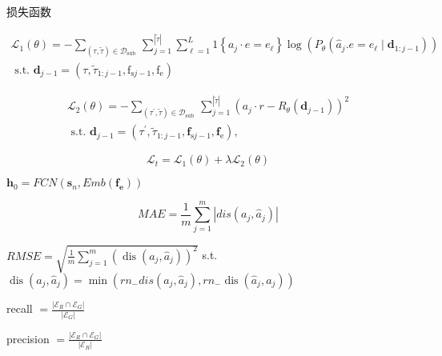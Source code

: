 损失函数

$$
\begin{gathered}
\mathcal{L}_{1}(\theta)=-\sum_{(\tau, \tilde{\tau}) \in \mathcal{D}_{\text {sub }}} \sum_{j=1}^{|\tilde{\tau}|} \sum_{\ell=1}^{L} 1\left\{a_{j} \cdot e=e_{\ell}\right\} \log \left(P_{\theta}\left(\hat{a}_{j} . e=e_{\ell} \mid \mathbf{d}_{1: j-1}\right)\right) \\
\text { s.t. } \mathbf{d}_{j-1}=\left(\tau, \tilde{\tau}_{1: j-1}, \mathrm{f}_{\mathrm{s} j-1}, \mathrm{f}_{\mathrm{e}}\right)
\end{gathered}
$$

$$
\begin{aligned}
\mathcal{L}_{2}(\theta)=-\sum_{\left(\tau^{\prime}, \tilde{\tau}\right) \in \mathcal{D}_{\text {sub }}} \sum_{j=1}^{|\tilde{\tau}|}\left(a_{j} \cdot r-R_{\theta}\left(\mathbf{d}_{j-1}\right)\right)^{2} \\
\text { s.t. } \mathbf{d}_{j-1}=\left(\tau^{\prime}, \tilde{\tau}_{1: j-1}, \mathbf{f}_{\mathrm{s} j-1}, \mathbf{f}_{\mathrm{e}}\right),
\end{aligned}
$$

$$\mathcal{L}_t = \mathcal{L}_1(\theta) + \lambda \mathcal{L}_2(\theta)$$

$\mathbf{h}_{0}=FCN(\mathbf{s} _n, Emb(\mathbf{f_e} ))$

$$ M A E=\frac{1}{m} \sum_{j=1}^{m}\left|d i s\left(a_{j}, \hat{a}_{j}\right)\right| $$

$ R M S E=\sqrt{\frac{1}{m} \sum_{j=1}^{m}\left(\operatorname{dis}\left(a_{j}, \hat{a}_{j}\right)\right)^{2}} $
s.t. $ \operatorname{dis}\left(a_{j}, \hat{a}_{j}\right)=\min \left(r n_{-} d i s\left(a_{j}, \hat{a}_{j}\right), r n_{-} \operatorname{dis}\left(\hat{a}_{j}, a_{j}\right)\right) $

recall $ =\frac{\left|\mathcal{E}_{R} \cap \mathcal{E}_{G}\right|}{\left|\mathcal{E}_{G}\right|} $

precision $ =\frac{\left|\mathcal{E}_{R} \cap \mathcal{E}_{G}\right|}{\left|\mathcal{E}_{R}\right|} $